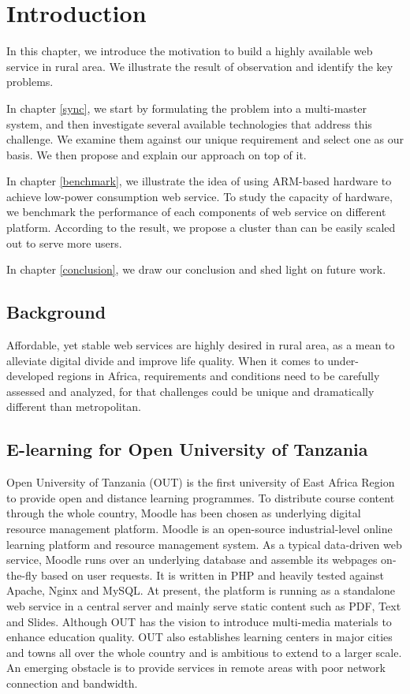 \chapter{Introduction}

In this chapter, we introduce the motivation to build a highly available web service in rural area. We illustrate the result of observation and identify the key problems.

In chapter \ref{sync}, we start by formulating the problem into a multi-master system, and then investigate several available technologies that address this challenge. We examine them against our unique requirement and select one as our basis. We then propose and explain our approach on top of it.

In chapter \ref{benchmark}, we illustrate the idea of using ARM-based hardware to achieve low-power consumption web service. To study the capacity of hardware, we benchmark the performance of each components of web service on different platform. According to the result, we propose a cluster than can be easily scaled out to serve more users.

In chapter \ref{conclusion}, we draw our conclusion and shed light on future work.
\section{Background}
Affordable, yet stable web services are highly desired in rural area, as a mean to alleviate digital divide and improve life quality. When it comes to under-developed regions in Africa, requirements and conditions need to be carefully assessed and analyzed, for that challenges could be unique and dramatically different than metropolitan.

\section{E-learning for Open University of Tanzania} \label{out_intro}
Open University of Tanzania (OUT) \cite{out} is the first university of East Africa Region to provide open and distance learning programmes. To distribute course content through the whole country, Moodle has been chosen as underlying digital resource management platform. Moodle\cite{moodle} is an open-source industrial-level online learning platform and resource management system. As a typical data-driven web service, Moodle runs over an underlying database and assemble its webpages on-the-fly based on user requests. It is written in PHP and heavily tested against Apache, Nginx and MySQL. At present, the platform is running as a standalone web service in a central server and mainly serve static content such as PDF, Text and Slides. Although OUT has the vision to introduce multi-media materials to enhance education quality. OUT also establishes learning centers in major cities and towns all over the whole country and is ambitious to extend to a larger scale. An emerging obstacle is to provide services in remote areas with poor network connection and bandwidth.

